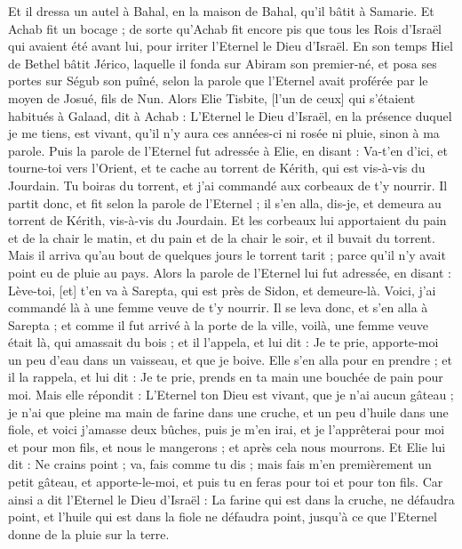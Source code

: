 \begin{multicols}{2}
Et il dressa un autel à Bahal, en la maison de Bahal, qu'il bâtit à Samarie.
Et Achab fit un bocage ; de sorte qu'Achab fit encore pis que tous les Rois d'Israël qui avaient été avant lui, pour irriter l'Eternel le Dieu d'Israël.
En son temps Hiel de Bethel bâtit Jérico, laquelle il fonda sur Abiram son premier-né, et posa ses portes sur Ségub son puîné, selon la parole que l'Eternel avait proférée par le moyen de Josué, fils de Nun.
\VerseOne{}Alors Elie Tisbite, [l'un de ceux] qui s'étaient habitués à Galaad, dit à Achab : L'Eternel le Dieu d'Israël, en la présence duquel je me tiens, est vivant, qu'il n'y aura ces années-ci ni rosée ni pluie, sinon à ma parole.
Puis la parole de l'Eternel fut adressée à Elie, en disant :
Va-t'en d'ici, et tourne-toi vers l'Orient, et te cache au torrent de Kérith, qui est vis-à-vis du Jourdain.
Tu boiras du torrent, et j'ai commandé aux corbeaux de t'y nourrir.
Il partit donc, et fit selon la parole de l'Eternel ; il s'en alla, dis-je, et demeura au torrent de Kérith, vis-à-vis du Jourdain.
Et les corbeaux lui apportaient du pain et de la chair le matin, et du pain et de la chair le soir, et il buvait du torrent.
Mais il arriva qu'au bout de quelques jours le torrent tarit ; parce qu'il n'y avait point eu de pluie au pays.
Alors la parole de l'Eternel lui fut adressée, en disant :
Lève-toi, [et] t'en va à Sarepta, qui est près de Sidon, et demeure-là. Voici, j'ai commandé là à une femme veuve de t'y nourrir.
Il se leva donc, et s'en alla à Sarepta ; et comme il fut arrivé à la porte de la ville, voilà, une femme veuve était là, qui amassait du bois ; et il l'appela, et lui dit : Je te prie, apporte-moi un peu d'eau dans un vaisseau, et que je boive.
Elle s'en alla pour en prendre ; et il la rappela, et lui dit : Je te prie, prends en ta main une bouchée de pain pour moi.
Mais elle répondit : L'Eternel ton Dieu est vivant, que je n'ai aucun gâteau ; je n'ai que pleine ma main de farine dans une cruche, et un peu d'huile dans une fiole, et voici j'amasse deux bûches, puis je m'en irai, et je l'apprêterai pour moi et pour mon fils, et nous le mangerons ; et après cela nous mourrons.
Et Elie lui dit : Ne crains point ; va, fais comme tu dis ; mais fais m'en premièrement un petit gâteau, et apporte-le-moi, et puis tu en feras pour toi et pour ton fils.
Car ainsi a dit l'Eternel le Dieu d'Israël : La farine qui est dans la cruche, ne défaudra point, et l'huile qui est dans la fiole ne défaudra point, jusqu'à ce que l'Eternel donne de la pluie sur la terre.

\end{multicols}
